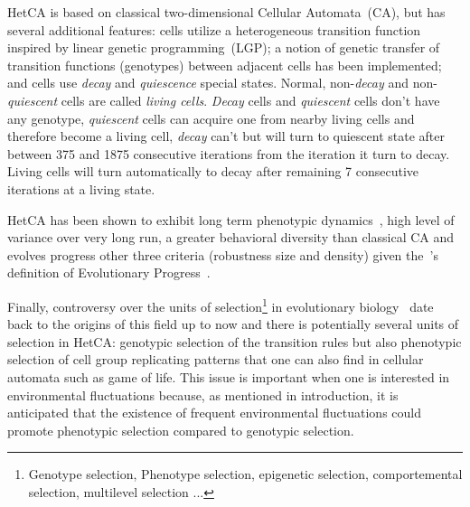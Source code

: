 HetCA is based on classical two-dimensional Cellular Automata~(CA), but has several additional features: cells utilize a heterogeneous transition function inspired by linear genetic programming~(LGP); a notion of genetic transfer of transition functions (genotypes) between adjacent cells has been implemented; and cells use \emph{decay} and \emph{quiescence} special states. Normal, non-\emph{decay} and non-\emph{quiescent} cells are called \emph{living cells}. \emph{Decay} cells and \emph{quiescent} cells don't have any genotype, \emph{quiescent} cells can acquire one from nearby living cells and therefore become a living cell, \emph{decay} can't but will turn to quiescent state after between 375 and 1875 consecutive iterations from the iteration it turn to decay. Living cells will turn automatically to decay after remaining 7 consecutive iterations at a living state. 

HetCA has been shown to exhibit long term phenotypic dynamics~\citep{medernach2013long}, high level of variance over very long run, a greater behavioral diversity than classical CA and evolves progress other three criteria (robustness size and density) given the~\cite{shanahan2012evolutionary}'s definition of Evolutionary Progress~\citep{medernach2015evolutionary}.


Finally, controversy over the units of selection\footnote{Genotype selection, Phenotype selection, epigenetic selection, comportemental selection, multilevel selection \cite{lloyd2012unitsandlevelsofselection}...} in evolutionary biology~\citep{okasha2006evolution} date back to the origins of this field up to now and there is potentially several units of selection in HetCA: genotypic selection of the transition rules but also phenotypic selection of cell group replicating patterns that one can also find in cellular automata such as game of life.  This issue is important when one is interested in environmental fluctuations because, as mentioned in introduction, it is anticipated that the existence of frequent environmental fluctuations could promote phenotypic selection compared to genotypic selection.


